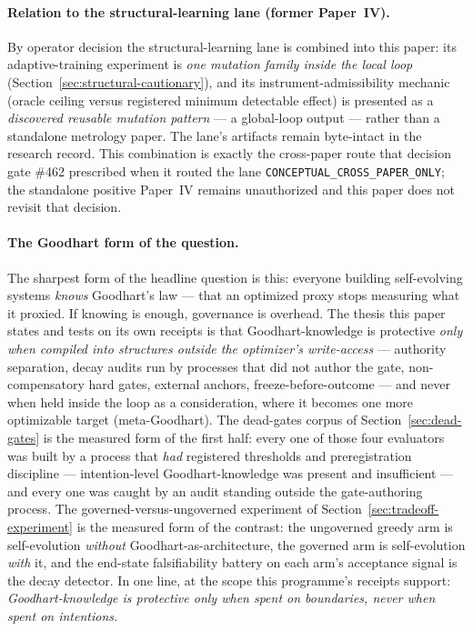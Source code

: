 \paragraph{Relation to the structural-learning lane (former Paper~IV).}
By operator decision the structural-learning lane is combined into this paper: its
adaptive-training experiment is \emph{one mutation family inside the local loop}
(Section~\ref{sec:structural-cautionary}), and its instrument-admissibility mechanic
(oracle ceiling versus registered minimum detectable effect) is presented as a
\emph{discovered reusable mutation pattern} --- a global-loop output --- rather than a
standalone metrology paper. The lane's artifacts remain byte-intact in the research
record. This combination is exactly the cross-paper route that decision gate \#462
prescribed when it routed the lane \texttt{CONCEPTUAL\_CROSS\_PAPER\_ONLY}; the
standalone positive Paper~IV remains unauthorized and this paper does not revisit that
decision.

\paragraph{The Goodhart form of the question.}
The sharpest form of the headline question is this: everyone building self-evolving
systems \emph{knows} Goodhart's law --- that an optimized proxy stops measuring what
it proxied. If knowing is enough, governance is overhead. The thesis this paper
states and tests on its own receipts is that Goodhart-knowledge is protective
\emph{only when compiled into structures outside the optimizer's write-access} ---
authority separation, decay audits run by processes that did not author the gate,
non-compensatory hard gates, external anchors, freeze-before-outcome --- and never
when held inside the loop as a consideration, where it becomes one more optimizable
target (meta-Goodhart). The dead-gates corpus of
Section~\ref{sec:dead-gates} is the measured form of the first half: every one of
those four evaluators was built by a process that \emph{had} registered thresholds
and preregistration discipline --- intention-level Goodhart-knowledge was present and
insufficient --- and every one was caught by an audit standing outside the
gate-authoring process. The governed-versus-ungoverned experiment of
Section~\ref{sec:tradeoff-experiment} is the measured form of the contrast: the
ungoverned greedy arm is self-evolution \emph{without} Goodhart-as-architecture, the
governed arm is self-evolution \emph{with} it, and the end-state falsifiability
battery on each arm's acceptance signal is the decay detector. In one line, at the
scope this programme's receipts support: \emph{Goodhart-knowledge is protective only
when spent on boundaries, never when spent on intentions.}


